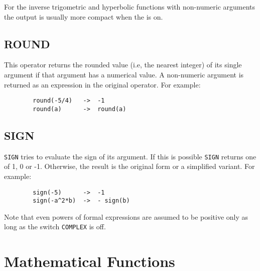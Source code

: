For the inverse trigometric and hyperbolic functions with non-numeric arguments the output is usually more compact when the  is on.

\subsection{ROUND}
\hypertarget{operator:ROUND}{}
This operator returns the rounded value (i.e, the nearest integer) of its
single argument if that argument has a numerical value.  A non-numeric
argument is returned as an expression in the original operator.  For
example:
\begin{verbatim}
        round(-5/4)   ->  -1
        round(a)      ->  round(a)
\end{verbatim}

\subsection{SIGN}
\hypertarget{operator:SIGN}{}
\texttt{SIGN} tries to evaluate the sign of its argument. If this
is possible \texttt{SIGN} returns one of 1, 0 or -1.  Otherwise, the result
is the original form or a simplified variant. For example:
\begin{verbatim}
        sign(-5)      ->  -1
        sign(-a^2*b)  ->  - sign(b)
\end{verbatim}
Note that even powers of formal expressions are assumed to be
positive only as long as the switch \texttt{COMPLEX} is off.

\section{Mathematical Functions}
\hypertarget{operator:ACOS}{}
\hypertarget{operator:ACOSH}{}
\hypertarget{operator:ACOT}{}
\hypertarget{operator:ACOTH}{}
\hypertarget{operator:ACSC}{}
\hypertarget{operator:ACSCH}{}
\hypertarget{operator:ASEC}{}
\hypertarget{operator:ASECH}{}
\hypertarget{operator:ASIN}{}
\hypertarget{operator:ASINH}{}
\hypertarget{operator:ATAN}{}
\hypertarget{operator:ATANH}{}
\hypertarget{operator:ATAN2}{}
\hypertarget{operator:COS}{}
\hypertarget{operator:COSH}{}
\hypertarget{operator:COT}{}
\hypertarget{operator:COTH}{}
\hypertarget{operator:CSC}{}
\hypertarget{operator:CSCH}{}
\hypertarget{operator:EXP}{}
\hypertarget{operator:HYPOT}{}
\hypertarget{operator:LOG}{}
\hypertarget{operator:LOGB}{}
\hypertarget{operator:LOG10}{}
\hypertarget{operator:SEC}{}
\hypertarget{operator:SECH}{}
\hypertarget{operator:SIN}{}
\hypertarget{operator:SINH}{}
\hypertarget{operator:SQRT}{}
\hypertarget{operator:TAN}{}
\hypertarget{operator:TANH}{}

